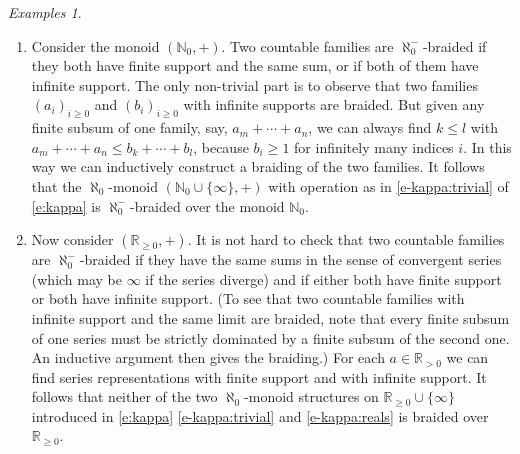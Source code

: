 \documentclass[a4paper,11pt,oneside]{amsart}
\theoremstyle{remark}
\newtheorem{examples}[teor]{Examples}
\newcommand{\bN}{\mathbb N}
\newcommand{\bR}{\mathbb R}
\begin{document}
\begin{examples} \label{e:kappa-braided} \mbox{}
  \begin{enumerate}
  \item \label{e:kappa-braided:N} Consider the monoid $(\bN_0,+)$.
    Two countable families are $\aleph_0^-$-braided if they both have finite support and the same sum, or if both of them have infinite support.
    The only non-trivial part is to observe that two families $(a_i)_{i \ge 0}$ and $(b_i)_{i \ge 0}$ with infinite supports are braided.
    But given any finite subsum of one family, say, $a_m+ \cdots + a_n$, we can always find $k \le l$ with $a_m + \cdots + a_n \le b_k + \cdots + b_l$, because $b_i \ge 1$ for infinitely many indices $i$.
    In this way we can  inductively construct a braiding of the two families.
    It follows that the $\aleph_0$-monoid $(\bN_0 \cup \{\infty\}, +)$ with operation as in \ref{e-kappa:trivial} of \cref{e:kappa} is $\aleph_0^-$-braided over the monoid $\bN_0$.

  \item \label{e:kappa-braided:R} Now consider $(\bR_{\ge 0},+)$.
    It is not hard to check that two countable families are $\aleph_0^-$-braided if they have the same sums in the sense of convergent series (which may be $\infty$ if the series diverge) and if either both have finite support or both have infinite support.
    (To see that two countable families with infinite support and the same limit are braided, note that every finite subsum of one series must be strictly dominated by a finite subsum of the second one. An inductive argument then gives the braiding.)
    For each $a \in \bR_{>0}$ we can find series representations with finite support and with infinite support.
    It follows that neither of the two $\aleph_0$-monoid structures on $\bR_{\ge 0} \cup \{\infty\}$ introduced in \cref{e:kappa} \ref{e-kappa:trivial} and \ref{e-kappa:reals} is braided over $\bR_{\ge 0}$.


\end{enumerate}
\end{examples}
\end{document}
